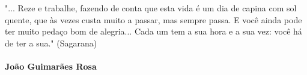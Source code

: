 {"... Reze e trabalhe, fazendo de conta que esta vida é um dia de capina 
com sol quente, que às vezes custa muito a passar, mas sempre passa. 
E você ainda pode ter muito pedaço bom de alegria... 
Cada um tem a sua hora e a sua vez: você há de ter a sua." (Sagarana)
}
{
\\
\\
\textbf{ João Guimarães Rosa } 
}